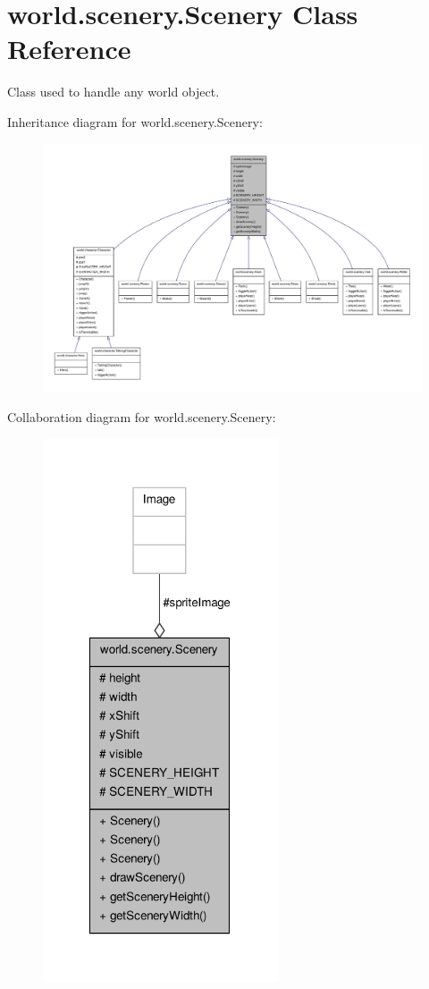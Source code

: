 \hypertarget{a00024}{\section{world.\-scenery.\-Scenery Class Reference}
\label{a00024}
}


Class used to handle any world object.  




Inheritance diagram for world.\-scenery.\-Scenery\-:
\nopagebreak
\begin{figure}[H]
\begin{center}
\leavevmode
\includegraphics[width=350pt]{a00176}
\end{center}
\end{figure}


Collaboration diagram for world.\-scenery.\-Scenery\-:
\nopagebreak
\begin{figure}[H]
\begin{center}
\leavevmode
\includegraphics[width=198pt]{a00177}
\end{center}
\end{figure}
